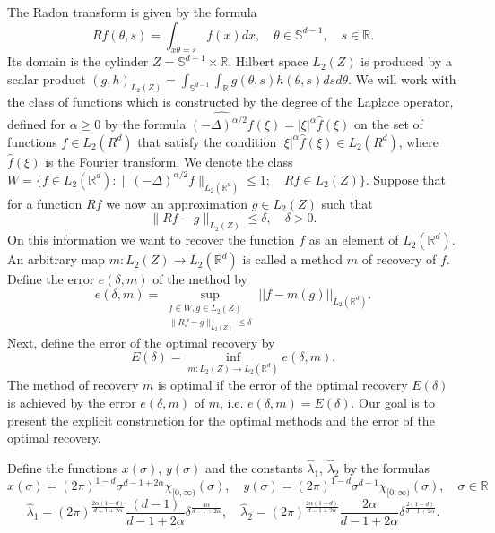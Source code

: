 \documentclass[12pt]{iopart}
\begin{document}
The Radon transform is given by the formula
	$$Rf(\theta,s)=\int_{x\theta=s}f(x)dx,\quad \theta\in\mathbb S^{d-1},\quad s\in\mathbb R.$$
Its domain is the cylinder $Z=\mathbb S^{d-1}\times\mathbb R.$ Hilbert space $L_2(Z)$ is produced by a scalar product	
	$(g,h)_{L_2(Z)}=\int_{\mathbb S^{d-1}}\int_{\mathbb R}g(\theta,s)\overline h(\theta,s)dsd\theta.$
We will work with the class of functions which is constructed by the degree of the Laplace operator, defined for $\alpha\ge 0$ by the formula $\widehat{(-\Delta)^{\alpha/2}f}(\xi)=|\xi|^\alpha \widehat f(\xi)$ on the set of functions $f\in L_2(R^d)$ that satisfy the condition $|\xi|^\alpha\widehat f(\xi)\in L_2(R^d)$, where $\widehat f(\xi)$ is the Fourier transform. We denote the class $ W=\{f\in L_2(\mathbb R^d) :
\|(-\Delta)^{\alpha/2}f\|_{L_2(\mathbb R^d)}\leqslant  1;\quad Rf\in L_2(Z) \}.  $
Suppose that for a function $Rf$ we now an approximation $g\in L_2(Z)$ such that
	$$\|Rf-g\|_{L_2(Z)}\le\delta, \quad\delta>0.$$
On this information we want to recover the function $f$ as an element of $ L_2(\mathbb R^d)$. An arbitrary map $m:L_2(Z)\rightarrow L_2(\mathbb R^d)$ is called a method $m$ of recovery of $f$. Define the error $e(\delta,m)$ of the method by
\[
  e(\delta,m)=\sup_{
  \begin{smallmatrix}
f\in W, g\in L_2(Z)\\ 
\|Rf-g\|_{L_2(Z)}\leqslant \delta
\end{smallmatrix}} ||f-m(g)||_{L_2(\mathbb R^d)}.
\] 
Next, define the error of the optimal recovery by
\begin{equation}
\label{opter}
E(\delta)=\inf_{m:L_2(Z)\rightarrow L_2(\mathbb R^d)}e(\delta,m).
\end{equation}
The method of recovery $m$ is optimal if the error of the optimal recovery $E(\delta)$ is achieved by the error $e(\delta,m)$ of $m$, i.e. $e(\delta,m)=E(\delta)$. Our goal is to present the explicit construction for the optimal methods and the error of the optimal recovery.

Define the functions $x(\sigma)$, $y(\sigma)$ and the constants $\widehat\lambda_1$, $\widehat\lambda_2$ by the formulas
  \begin{equation}
  \label{xy}
  x(\sigma)=(2\pi)^{1-d}\sigma^{d-1+2\alpha}\chi_{[0,\infty)}(\sigma),\quad
  y(\sigma)=(2\pi)^{1-d}\sigma^{d-1}\chi_{[0,\infty)}(\sigma),\quad \sigma\in\mathbb R
  \end{equation}
  \begin{equation}
    \label{lambda3.1}
    \widehat\lambda_1=(2\pi)^{\frac{2\alpha(1-d)}{d-1+2\alpha}}\frac{(d-1)}{d-1+2\alpha}\delta^\frac{4\alpha}{d-1+2\alpha},\quad \widehat\lambda_2=(2\pi)^{\frac{2\alpha(1-d)}{d-1+2\alpha}}\frac{2\alpha}{d-1+2\alpha}\delta^\frac{2(1-d)}{d-1+2\alpha}. 
  \end{equation}
\end{document}
